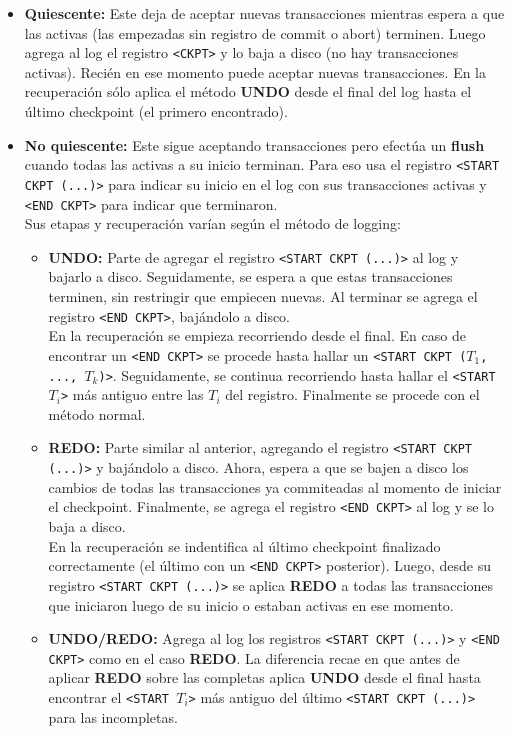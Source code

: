 \begin{itemize}
    \item \textbf{Quiescente:} Este deja de aceptar nuevas transacciones mientras espera a que las activas (las empezadas sin registro de commit o abort) terminen. Luego agrega al log el registro \texttt{<CKPT>} y lo baja a disco (no hay transacciones activas). Recién en ese momento puede aceptar nuevas transacciones. En la recuperación sólo aplica el método \textbf{UNDO} desde el final del log hasta el último checkpoint (el primero encontrado).
    \item \textbf{No quiescente:} Este sigue aceptando transacciones pero efectúa un \textbf{flush} cuando todas las activas a su inicio terminan. Para eso usa el registro \texttt{<START CKPT (...)>} para indicar su inicio en el log con sus transacciones activas y \texttt{<END CKPT>} para indicar que terminaron. \\
    Sus etapas y recuperación varían según el método de logging:
    \begin{itemize}
        \item \textbf{UNDO:} Parte de agregar el registro \texttt{<START CKPT (...)>} al log y bajarlo a disco. Seguidamente, se espera a que estas transacciones terminen, sin restringir que empiecen nuevas. Al terminar se agrega el registro \texttt{<END CKPT>}, bajándolo a disco. \\
        En la recuperación se empieza recorriendo desde el final. En caso de encontrar un \texttt{<END CKPT>} se procede hasta hallar un \texttt{<START CKPT ($T_1$, ..., $T_k$)>}. Seguidamente, se continua recorriendo hasta hallar el \texttt{<START $T_i$>} más antiguo entre las $T_i$ del registro. Finalmente se procede con el método normal.
        \item \textbf{REDO:} Parte similar al anterior, agregando el registro \texttt{<START CKPT (...)>} y bajándolo a disco. Ahora, espera a que se bajen a disco los cambios de todas las transacciones ya commiteadas al momento de iniciar el checkpoint. Finalmente, se agrega el registro \texttt{<END CKPT>} al log y se lo baja a disco. \\
        En la recuperación se indentifica al último checkpoint finalizado correctamente (el último con un \texttt{<END CKPT>} posterior). Luego, desde su registro \texttt{<START CKPT (...)>} se aplica \textbf{REDO} a todas las transacciones que iniciaron luego de su inicio o estaban activas en ese momento.
        \item \textbf{UNDO/REDO:} Agrega al log los registros \texttt{<START CKPT (...)>} y \texttt{<END CKPT>} como en el caso \textbf{REDO}. La diferencia recae en que antes de aplicar \textbf{REDO} sobre las completas aplica \textbf{UNDO} desde el final hasta encontrar el \texttt{<START $T_i$>} más antiguo del último \texttt{<START CKPT (...)>} para las incompletas.
    \end{itemize}
\end{itemize}

